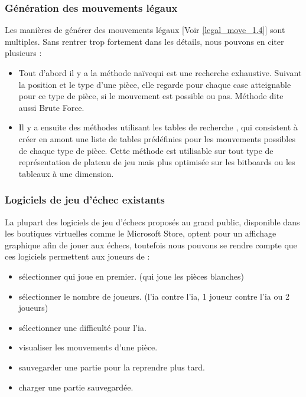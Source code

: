 \huge\documentclass{article}
\begin{document}
\subsubsection{Génération des mouvements légaux}
Les manières de générer des mouvements légaux [Voir \ref{legal_move_1.4}] sont multiples. Sans rentrer trop fortement dans les détails, nous pouvons en citer plusieurs :\newline
\begin{itemize}
    \item Tout d'abord il y a la méthode \guillemotleft naïve\guillemotright  qui est une recherche exhaustive. Suivant la position et le type d'une pièce, elle regarde pour chaque case atteignable pour ce type de pièce, si le mouvement est possible ou pas. Méthode dite aussi Brute Force.\cite{Brute_force}
    \item Il y a ensuite des méthodes utilisant les tables de recherche \cite{Lookup_table}, qui consistent à créer en amont une liste de tables prédéfinies pour les mouvements possibles de chaque type de pièce. Cette méthode est utilisable sur tout type de représentation de plateau de jeu mais plus optimisée sur les bitboards ou les tableaux à une dimension.
\end{itemize}

\subsubsection{Logiciels de jeu d'échec existants}
La plupart des logiciels de jeu d'échecs proposés au grand public, disponible dans les boutiques virtuelles comme le Microsoft Store, optent pour un affichage graphique afin de jouer aux échecs, toutefois nous pouvons se rendre compte que ces logiciels permettent aux joueurs de :

\begin{itemize}
\item sélectionner qui joue en premier. (qui joue les pièces blanches)
\item sélectionner le nombre de joueurs. (l'ia contre l'ia, 1 joueur contre l'ia ou 2 joueurs)
\item sélectionner une difficulté pour l'ia.
\item visualiser les mouvements d'une pièce.
\item sauvegarder une partie pour la reprendre plus tard. 
\item charger une partie sauvegardée.
\newline
\end{itemize}
\end{document}
